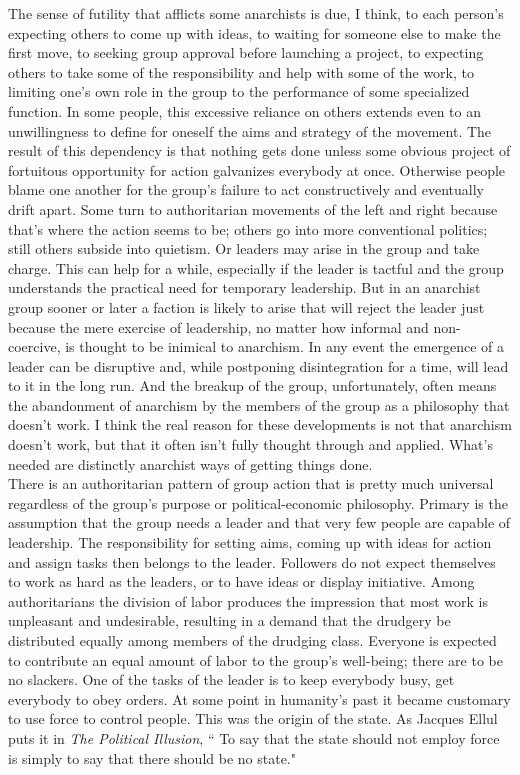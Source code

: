 \documentclass[12pt, onecolumn, letterpaper, oneside]{book}
\begin{document}
The sense of futility that afflicts some anarchists is due, I think, to each person's expecting others to come up with ideas, to waiting for someone else to make the first move, to seeking group approval before launching a project, to expecting others to take some of the responsibility and help with some of the work, to limiting one's own role in the group to the performance of some specialized function. In some people, this excessive reliance on others extends even to an unwillingness to define for oneself the aims and strategy of the movement. The result of this dependency is that nothing gets done unless some obvious project of fortuitous opportunity for action galvanizes everybody at once. Otherwise people blame one another for the group's failure to act constructively and eventually drift apart. Some turn to authoritarian movements of the left and right because that's where the action seems to be; others go into more conventional politics; still others subside into quietism. Or leaders may arise in the group and take charge. This can help for a while, especially if the leader is tactful and the group understands the practical need for temporary leadership. But in an anarchist group sooner or later a faction is likely to arise that will reject the leader just because the mere exercise of leadership, no matter how informal and non-coercive, is thought to be inimical to anarchism. In any event the emergence of a leader can be disruptive and, while postponing disintegration for a time, will lead to it in the long run. And the breakup of the group, unfortunately, often means the abandonment of anarchism by the members of the group as a philosophy that doesn't work. I think the real reason for these developments is not that anarchism doesn't work, but that it often isn't fully thought through and applied. What's needed are distinctly anarchist ways of getting things done.\\
There is an authoritarian pattern of group action that is pretty much universal regardless of the group's purpose or political-economic philosophy. Primary is the assumption that the group needs a leader and that very few people are capable of leadership. The responsibility for setting aims, coming up with ideas for action and assign tasks then belongs to the leader. Followers do not expect themselves to work as hard as the leaders, or to have ideas or display initiative. Among authoritarians the division of labor produces the impression that most work is unpleasant and undesirable, resulting in a demand that the drudgery be distributed equally among members of the drudging class. Everyone is expected to contribute an equal amount of labor to the group's well-being; there are to be no slackers. One of the tasks of the leader is to keep everybody busy, get everybody to obey orders. At some point in humanity's past it became customary to use force to control people. This was the origin of the state. As Jacques Ellul puts it in \emph{The Political Illusion}, `` To say that the state should not employ force is simply to say that there should be no state."\\
\end{document}
